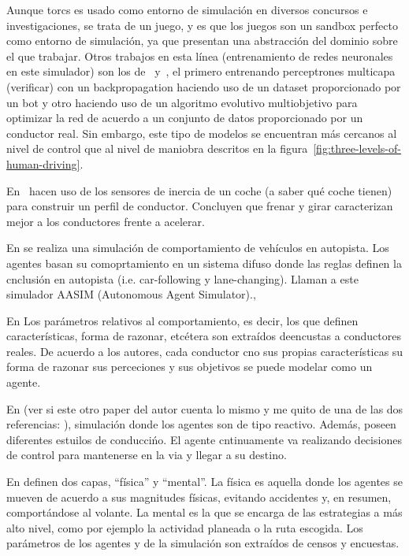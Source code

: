 Aunque \gls{torcs} es usado como entorno de simulación en diversos concursos e investigaciones, se trata de un juego, y es que los juegos son un sandbox perfecto como entorno de simulación, ya que presentan una abstracción del dominio sobre el que trabajar. Otros trabajos en esta línea (entrenamiento de redes neuronales en este simulador) son los de~\cite{munoz2009controller} y~\cite{van2009robust}, el primero entrenando perceptrones multicapa (\TODO verificar) con un backpropagation haciendo uso de un dataset proporcionado por un bot y otro haciendo uso de un algoritmo evolutivo multiobjetivo para optimizar la red de acuerdo a un conjunto de datos proporcionado por un conductor real. Sin embargo, este tipo de modelos se encuentran más cercanos al nivel de control que al nivel de maniobra descritos en la figura~\ref{fig:three-levels-of-human-driving}.

En~\cite{van2013driver} hacen uso de los sensores de inercia de un coche (a saber qué coche tienen) para construir un perfil de conductor. Concluyen que frenar y girar caracterizan mejor a los conductores frente a acelerar.

En \cite{Das} se realiza una simulación de comportamiento de vehículos en autopista. Los agentes basan su comoprtamiento en un sistema difuso donde las reglas definen la cnclusión en autopista (i.e. car-following y lane-changing). Llaman a este simulador AASIM (Autonomous Agent Simulator).,

En \cite{Dia2002} Los parámetros relativos al comportamiento, es decir, los que definen características, forma de razonar, etcétera son extraídos deencustas a conductores reales. De acuerdo a los autores, cada conductor cno sus propias características su forma de razonar sus perceciones y sus objetivos se puede modelar como un agente.

En \cite{Ehlert2001} (ver si este otro paper del autor cuenta lo mismo y me quito de una de las dos referencias: \cite{Ehlert2001-2}), simulación donde los agentes son de tipo reactivo. Además, poseen diferentes estuilos de conduccińo. El agente cntinuamente va realizando decisiones de control para mantenerse en la via y llegar a su destino.

En \cite{} definen dos capas, \enquote{física} y \enquote{mental}. La física es aquella donde los agentes se mueven de acuerdo a sus magnitudes físicas, evitando accidentes y, en resumen, comportándose al volante. La mental es la que se encarga de las estrategias a más alto nivel, como por ejemplo la actividad planeada o la ruta escogida. Los parámetros de los agentes y de la simulación son extraídos de censos y encuestas.